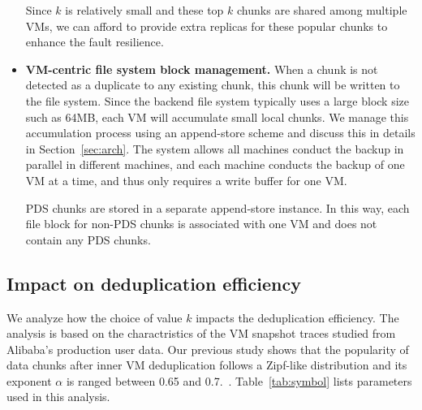 \begin{itemize}
Since $k$ is relatively small and these top $k$ chunks are shared among multiple VMs, 
we can afford to provide extra replicas for these popular chunks to enhance the fault resilience.

\item \textbf{VM-centric file system block management.}
When a chunk is not detected as a duplicate to any existing chunk, this chunk will be written
to the file system. Since the backend file system typically uses a large block size such as 64MB, each VM will 
accumulate small local chunks. We manage this accumulation process using an append-store  scheme
and discuss this in details in Section~\ref{sec:arch}.
The system allows all machines conduct the backup in parallel in different machines, and each machine
conducts the backup of one VM at a time, and thus only requires a write  buffer for one VM.

PDS chunks are stored in a separate append-store instance. In this way, each
file block for non-PDS chunks is associated with one VM and does not contain
any PDS chunks. 
\end{itemize}

 \subsection{Impact on deduplication efficiency}




We analyze how the choice of value  $k$ impacts the deduplication efficiency.
The analysis is based on the charactristics  of the VM snapshot traces
studied from  Alibaba's production user data.
Our previous study shows that the popularity of data chunks after inner VM deduplication follows 
a Zipf-like distribution\cite{zipf} and its
exponent $\alpha$ is ranged between 0.65  and  0.7.~\cite{ieeecloud}. 
Table~\ref{tab:symbol} lists parameters used in this analysis.


